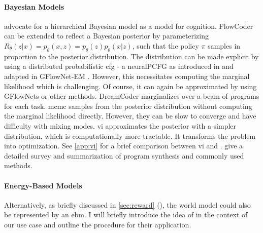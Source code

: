 \paragraph*{Bayesian Models}
\citet{griffithsBayesianModelsCognition} advocate for a hierarchical Bayesian model as a model for cognition.
FlowCoder can be extended to reflect a Bayesian posterior by parameterizing $R_\theta(z|x) = p_\theta(x, z) = p_\theta(z)p_\theta(x|z)$, such that the policy $\pi$ samples in proportion to the posterior distribution. The distribution can be made explicit by using a distributed probabilistic \acrshort{cfg} - a neuralPCFG as introduced in \citet{kimCompoundProbabilisticContextFree2019} and adapted in GFlowNet-EM \cite{Hu_Malkin_Jain_Everett_Graikos_Bengio_2023}.
However, this necessitates computing the marginal likelihood which is challenging. Of course, it can again be approximated by using GFlowNets or other methods. 
DreamCoder marginalizes over a beam of programs for each task.
\acrfull{mcmc} samples from the posterior distribution without computing the marginal likelihood directly. However, they can be slow to converge and have difficulty with mixing modes.
\acrfull{vi} approximates the posterior with a simpler distribution, which is computationally more tractable. It transforms the problem into optimization. See \autoref{app:vi} for a brief comparison between \acrshort{vi} and . \citet{gulwaniProgramSynthesis2017} give a detailed survey and summarization of program synthesis and commonly used methods.

\paragraph*{Energy-Based Models}

Alternatively, as briefly discussed in \autoref{sec:reward} (), the world model could also be represented by an \acrlong{ebm}. I will briefly introduce the idea of  in the context of our use case and outline the procedure for their application.

